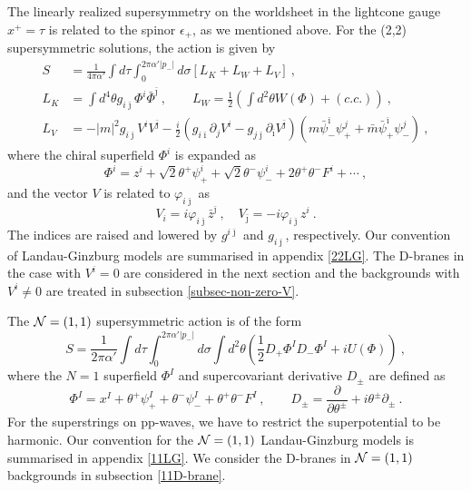 \documentclass[a4paper,12pt]{article}
\numberwithin{equation}{section}
\newcommand{\del}{\partial}
\newcommand{\ib}{\bar{\imath}}
\newcommand{\jb}{\bar{\jmath}}
\newcommand{\mb}{\bar{m}}
\newcommand{\zb}{\bar{z}}
\newcommand{\vp}{\varphi}
\newcommand{\nn}{\nonumber\\}
\newcommand{\Ncal}{{\cal N}}
\newcommand{\ta}{\theta}
\newcommand{\deldel}[2]{\frac{\del #1}{\del #2}}
\newcommand{\psb}{\bar{\psi}}
\newcommand{\Phb}{\bar{\Phi}}
\begin{document}
The linearly realized supersymmetry on the worldsheet in the lightcone 
gauge $x^+=\tau$
is related to the spinor $\epsilon_+$, as we mentioned above. 
For the (2,2) supersymmetric solutions,
the action is given by
\begin{align}
 S &= \frac{1}{4\pi \alpha'} \int d \tau \int_0^{2\pi \alpha' |p_-|} d \sigma
 \left[L_{K}+L_{W}+L_{V}\right] ~,\nn
  L_K&=
      \int d^4 \theta
                              g_{i\jb}\Phi^{i}\Phb^{\jb}~, \qquad
 L_{W}=\frac12 \left(\int d^2 \theta W(\Phi)
 +(c.c.) \right)~,\nn
 L_{V}&=-|m|^2 g_{i\jb}V^{i}V^{\jb}
 -\frac{i}{2}(g_{i\ib}\del_{j}V^{i}-g_{j\jb}\del_{\ib}V^{\jb})
  (m\psb_{-}^{\ib}\psi_{+}^{j}+\mb\psb_{+}^{\ib}\psi_{-}^{j})~,
\label{LG}
\end{align}
where the chiral superfield $\Phi^i$ is expanded as
\begin{equation}
 \Phi^i = z^i + \sqrt{2} \ta^+ \psi^i_+ + \sqrt{2} \theta^{-} \psi^i_{-} 
 + 2 \ta^{+} \ta^{-} F^i + \cdots ~,
\end{equation}
and the vector $V$ is related to $\vp_{i\jb}$ as
\begin{equation}
 V_{i}=i \vp_{i\jb}\zb^{\jb}~,\quad V_{\jb}=-i \vp_{i\jb}z^{i}~.
\end{equation}
The indices are raised and lowered by $g^{i\jb}$ and $g_{i\jb}$, respectively.
Our convention of Landau-Ginzburg models are summarised in appendix \ref{22LG}.
The D-branes in the case with $V^{i}=0$ are considered in the next section
and the backgrounds with $V^{i}\ne 0$ 
are treated in subsection \ref{subsec-non-zero-V}.

The ${\cal N} = (1,1)$ supersymmetric action is of the form
\begin{equation}
 S = \frac{1}{2 \pi \alpha'} \int d \tau \int _0 ^{2\pi \alpha'|p_-|}
   d \sigma \int d^2 \theta \left(
        \frac12 D_{+} \Phi^{I} D_{-} \Phi^{I} + i U(\Phi)
   \right) ~,
 \label{N=1action}
\end{equation}
where the $N=1$ superfield $\Phi^{I}$ and supercovariant derivative
$D_{\pm}$ are defined as
\begin{equation}
 \Phi^{I}=x^{I}+\ta^{+}\psi_{+}^{I} 
 + \ta^{-}\psi_{-}^{I} +  \ta^{+}\ta^{-}F^I ~,
\qquad 
 D_{\pm}=\deldel{}{\ta^{\pm}}+i\ta^{\pm}\del_{\pm} ~.
\end{equation}
For the superstrings on pp-waves,
we have to restrict the superpotential to be harmonic. 
Our convention for the $\Ncal=(1,1)$ Landau-Ginzburg models is summarised
in appendix \ref{11LG}. We consider the D-branes in $\Ncal=(1,1)$ backgrounds
in subsection \ref{11D-brane}.
\end{document}
